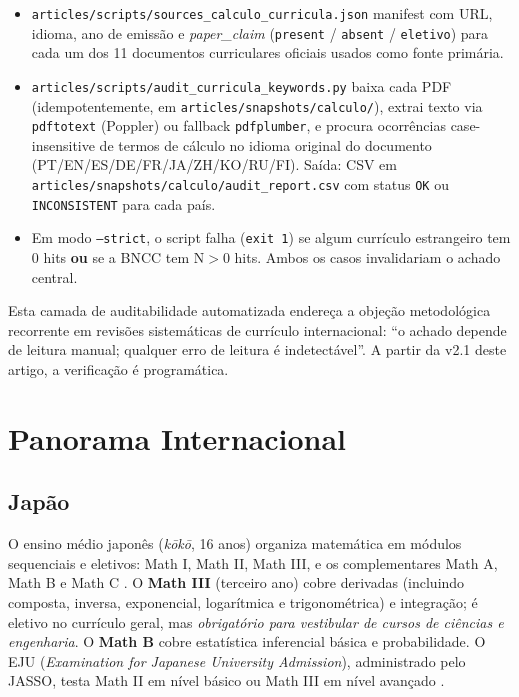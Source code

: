 \documentclass[12pt,a4paper,oneside]{article}
\begin{document}
\begin{itemize}
\item \texttt{articles/scripts/sources\_calculo\_curricula.json}
  \textemdash{} manifest com URL, idioma, ano de emissão e
  \emph{paper\_claim} (\texttt{present} / \texttt{absent} /
  \texttt{eletivo}) para cada um dos 11 documentos curriculares
  oficiais usados como fonte primária.
\item \texttt{articles/scripts/audit\_curricula\_keywords.py}
  \textemdash{} baixa cada PDF (idempotentemente, em
  \texttt{articles/snapshots/calculo/}), extrai texto via
  \texttt{pdftotext} (Poppler) ou fallback \texttt{pdfplumber},
  e procura ocorrências case-insensitive de termos de cálculo no
  idioma original do documento (PT/EN/ES/DE/FR/JA/ZH/KO/RU/FI). Saída:
  CSV em \texttt{articles/snapshots/calculo/audit\_report.csv} com
  status \texttt{OK} ou \texttt{INCONSISTENT} para cada país.
\item Em modo \texttt{--strict}, o script falha (\texttt{exit 1}) se
  algum currículo estrangeiro tem 0 hits \textbf{ou} se a BNCC tem
  N$>$0 hits. Ambos os casos invalidariam o achado central.
\end{itemize}

Esta camada de auditabilidade automatizada endereça a objeção
metodológica recorrente em revisões sistemáticas de currículo
internacional: ``o achado depende de leitura manual; qualquer erro
de leitura é indetectável''. A partir da v2.1 deste artigo, a
verificação é programática.

\section{Panorama Internacional}

\subsection{Japão}

O ensino médio japonês (\emph{kōkō}, 16 anos) organiza
matemática em módulos sequenciais e eletivos: Math I, Math II, Math
III, e os complementares Math A, Math B e Math C
\cite{ref:jasso-eju,ref:levie-japan}. O \textbf{Math III} (terceiro
ano) cobre derivadas (incluindo composta, inversa, exponencial,
logarítmica e trigonométrica) e integração; é eletivo no currículo
geral, mas \emph{obrigatório para vestibular de cursos de ciências e
engenharia}. O \textbf{Math B} cobre estatística inferencial básica
e probabilidade. O EJU (\emph{Examination for Japanese University
Admission}), administrado pelo JASSO, testa Math II em nível básico
ou Math III em nível avançado \cite{ref:jasso-eju}.
\end{document}
